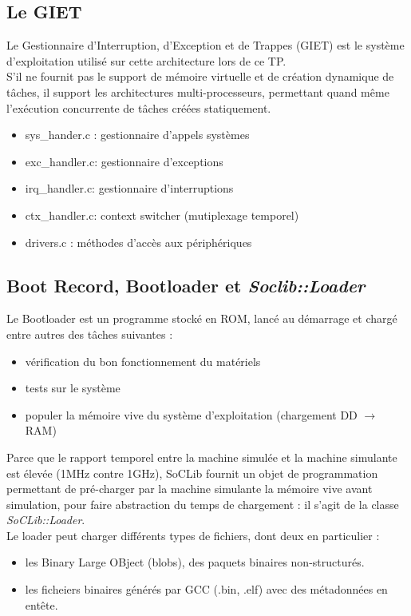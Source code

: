 \documentclass[10pt]{article}
\begin{document}
\subsection{Le GIET}
Le Gestionnaire d'Interruption, d'Exception et de Trappes (GIET) est le système
d'exploitation utilisé sur cette architecture lors de ce TP.\\
S'il ne fournit pas le support de mémoire virtuelle et de création dynamique
de tâches, il support les architectures multi-processeurs, permettant quand même
l'exécution concurrente de tâches créées statiquement.\\
\begin{itemize}
  \item sys\_hander.c : gestionnaire d'appels systèmes
  \item exc\_handler.c: gestionnaire d'exceptions
  \item irq\_handler.c: gestionnaire d'interruptions
  \item ctx\_handler.c: context switcher (mutiplexage temporel)
  \item drivers.c : méthodes d'accès aux périphériques
\end{itemize}

\subsection{Boot Record, Bootloader et {\it Soclib::Loader}}
Le Bootloader est un programme stocké en ROM, lancé au démarrage et chargé entre
autres des tâches suivantes :
\begin{itemize}
  \item vérification du bon fonctionnement du matériels
  \item tests sur le système
  \item populer la mémoire vive du système d'exploitation (chargement DD $\rightarrow$ RAM)
\end{itemize}

Parce que le rapport temporel entre la machine simulée et la machine simulante
est élevée (1MHz contre 1GHz), SoCLib fournit un objet de programmation permettant
de pré-charger par la machine simulante la mémoire vive avant simulation, pour
faire abstraction du temps de chargement : il s'agit de la classe {\it SoCLib::Loader}.\\
Le loader peut charger différents types de fichiers, dont deux en particulier :
\begin{itemize}
  \item les Binary Large OBject (blobs), des paquets binaires non-structurés.
  \item les ficheiers binaires générés par GCC (.bin, .elf) avec des métadonnées
  en entête.
\end{itemize}
\end{document}
